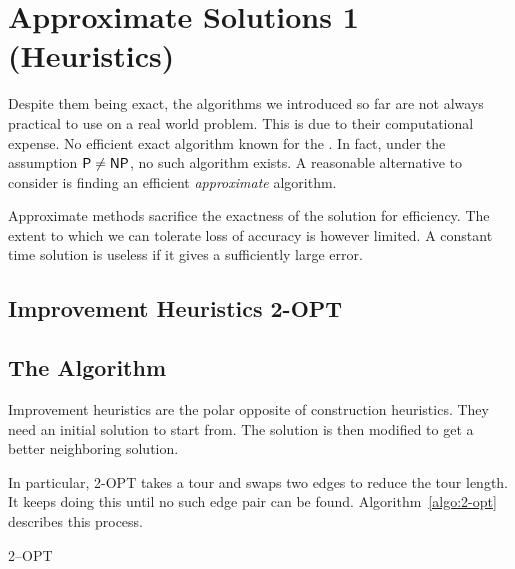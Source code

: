 \chapter{Approximate Solutions 1 (Heuristics)}

Despite them being exact, the algorithms we introduced so far are not always practical to use on a real world problem. This is due to their computational expense. No efficient exact algorithm known for the \TSP. In fact, under the assumption \(\textsf{P}\neq\textsf{NP}\), no such algorithm exists. A reasonable alternative to consider is finding an efficient \emph{approximate} algorithm.

Approximate methods sacrifice the exactness of the solution for efficiency. The extent to which we can tolerate loss of accuracy is however limited. A constant time solution is useless if it gives a sufficiently large error.





\section{Improvement Heuristics 2-OPT}

\section{The Algorithm}

Improvement heuristics are the polar opposite of construction heuristics. They need an initial solution to start from. The solution is then modified to get a better neighboring solution.

In particular, 2-OPT takes a tour and swaps two edges to reduce the tour length. It keeps doing this until no such edge pair can be found. Algorithm~\ref{algo:2-opt} describes this process.

\begin{algorithm}
    \caption{2--OPT}
    \label{algo:2-opt}


\end{algorithm}

